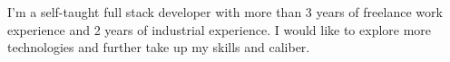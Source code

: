 

\begin{cvparagraph}

I'm a self-taught full stack developer with more than 3 years of freelance work experience and 2 years of industrial experience. I would like to explore more technologies and further take up my skills and caliber.
\end{cvparagraph}
